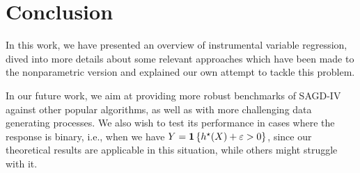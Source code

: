 \chapter{Conclusion}
\label{conclusion}

In this work, we have presented an overview of instrumental variable regression, dived into more details about some relevant approaches which have been made to the nonparametric version and explained our own attempt to tackle this problem.

In our future work, we aim at providing more robust benchmarks of SAGD-IV against other popular algorithms, as well as with more challenging data generating processes.
We also wish to test its performance in cases where the response is binary, i.e., when we have $ Y = \mathbf{1} \left\{ h^{ \star } ( X ) + \varepsilon > 0 \right\} $, since our theoretical results are applicable in this situation, while others might struggle with it.
